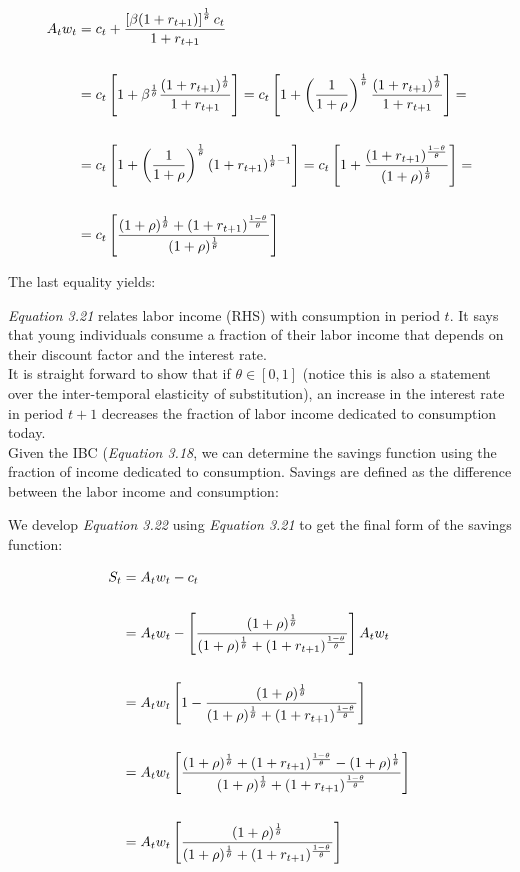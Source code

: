 \begin{align*}
A_tw_t  &=  c_t+\dfrac{\left[ \beta (1+r_{t+1}) \right] ^ \frac{1}{\theta} c_{t}}{1+r_{t+1}}\\
\\
   &=  c_t \left[ 1+\beta^\frac{1}{\theta} \dfrac{(1+r_{t+1})^\frac{1}{\theta}}{1+r_{t+1}} \right] = c_t \left[ 1+\left( \dfrac{1}{1+\rho} \right)^\frac{1}{\theta} \dfrac{(1+r_{t+1})^\frac{1}{\theta}}{1+r_{t+1}} \right] = \\
\\
  &= c_t \left[ 1+\left( \dfrac{1}{1+\rho} \right)^\frac{1}{\theta} (1+r_{t+1})^{\frac{1}{\theta}-1} \right] = c_t \left[ 1+\dfrac{(1+r_{t+1})^{\frac{1-\theta}{\theta}}}{(1+\rho)^\frac{1}{\theta}} \right] = \\
\\
 &=  c_t \left[ \dfrac{(1+\rho)^\frac{1}{\theta} +(1+r_{t+1})^{\frac{1-\theta}{\theta}}}{(1+\rho)^\frac{1}{\theta}} \right] 
\end{align*}


\bigskip
The last equality yields:

\bigskip
\textit{Equation 3.21} relates labor income (RHS) with consumption in period $t$. It says that young individuals consume a fraction of their labor income that depends on their discount factor and the interest rate.\\

It is straight forward to show that if $\theta\in[0,1]$ (notice this is also a statement over the inter-temporal elasticity of substitution), an increase in the interest rate in period $t+1$ decreases the fraction of labor income dedicated to consumption today.\\

Given the IBC (\textit{Equation 3.18}, we can determine the savings function using the fraction of income dedicated to consumption. Savings are defined as the difference between the labor income and consumption:

We develop \textit{Equation 3.22} using \textit{Equation 3.21} to get the final form of the savings function:

\begin{align*}
S_t &= A_tw_t-c_t\\
\\
	&= A_tw_t - \left[  \dfrac{(1+\rho)^\frac{1}{\theta}}{(1+\rho)^\frac{1}{\theta}+ (1+r_{t+1})^{\frac{1-\theta}{\theta}}} \right] A_tw_t \\
	\\
	&= A_tw_t \left[ 1-\dfrac{(1+\rho)^\frac{1}{\theta}}{(1+\rho)^\frac{1}{\theta}+ (1+r_{t+1})^{\frac{1-\theta}{\theta}}} \right] \\
	\\
	&= A_tw_t \left[ \dfrac{(1+\rho)^\frac{1}{\theta}+ (1+r_{t+1})^{\frac{1-\theta}{\theta}}-(1+\rho)^{\frac{1}{\theta}}}{(1+\rho)^\frac{1}{\theta}+ (1+r_{t+1})^{\frac{1-\theta}{\theta}}} \right] \\
	\\
	&= A_tw_t \left[ \dfrac{(1+\rho)^\frac{1}{\theta}}{(1+\rho)^\frac{1}{\theta}+ (1+r_{t+1})^{\frac{1-\theta}{\theta}}} \right] \\
\end{align*}

